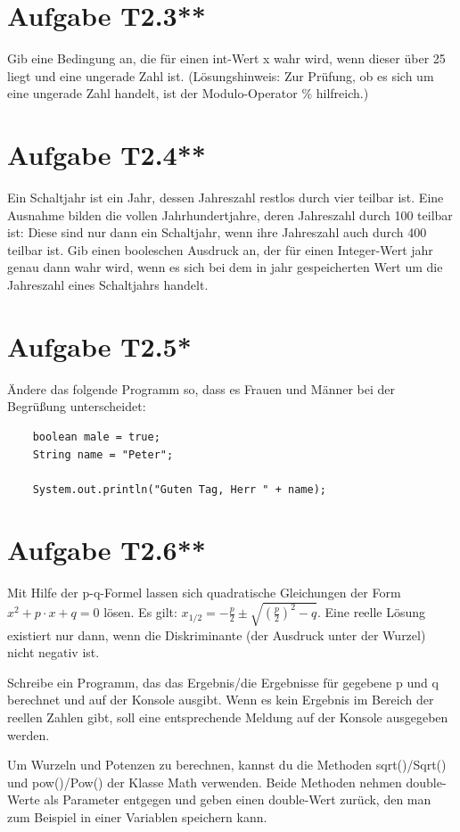 \documentclass[final,a4paper]{article}
\begin{document}
\section*{Aufgabe T2.3**}
Gib eine Bedingung an, die für einen int-Wert x wahr wird, wenn dieser über 25 liegt und eine ungerade Zahl ist. (Lösungshinweis:  Zur Prüfung, ob es sich um eine ungerade Zahl handelt, ist der Modulo-Operator \% hilfreich.)


\section*{Aufgabe T2.4**}
Ein Schaltjahr ist ein Jahr, dessen Jahreszahl restlos durch vier teilbar ist. Eine Ausnahme bilden die vollen Jahrhundertjahre, deren Jahreszahl durch 100 teilbar ist: Diese sind nur dann ein Schaltjahr, wenn ihre Jahreszahl auch durch 400 teilbar ist.
Gib einen booleschen Ausdruck an, der für einen Integer-Wert jahr genau dann wahr wird, wenn es sich bei dem in jahr gespeicherten Wert um die Jahreszahl eines Schaltjahrs handelt.

\section*{Aufgabe T2.5*}
Ändere das folgende Programm so, dass es Frauen und Männer bei der Begrüßung unterscheidet:
\begin{lstlisting}
	boolean male = true;
	String name = "Peter";
	
	System.out.println("Guten Tag, Herr " + name);
\end{lstlisting}

\section*{Aufgabe T2.6**}
Mit Hilfe der p-q-Formel lassen sich quadratische Gleichungen der Form \(x^2 + p \cdot x + q = 0\) lösen. Es gilt: \(x_{1/2} = - \frac{p}{2} \pm \sqrt{\left( \frac{p}{2}\right)^2 -q}\). Eine reelle Lösung existiert nur dann, wenn die Diskriminante (der Ausdruck unter der Wurzel) nicht negativ ist. 

Schreibe ein Programm, das das Ergebnis/die Ergebnisse für gegebene p und q berechnet und auf der Konsole ausgibt. Wenn es kein Ergebnis im Bereich der reellen Zahlen gibt, soll eine entsprechende Meldung auf der Konsole ausgegeben werden. 

Um Wurzeln und Potenzen zu berechnen, kannst du die Methoden sqrt()/Sqrt() und pow()/Pow() der Klasse Math verwenden. Beide Methoden nehmen double-Werte als Parameter entgegen und geben einen double-Wert zurück, den man zum Beispiel in einer Variablen speichern kann.
\end{document}
